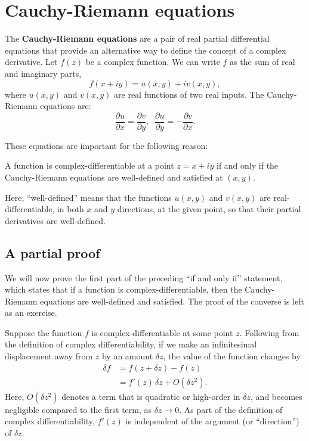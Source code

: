 \documentclass[10pt,a4paper]{article}
\begin{document}
\section{Cauchy-Riemann equations}
\label{cauchy-riemann-equations}

The \textbf{Cauchy-Riemann equations} are a pair of real partial
differential equations that provide an alternative way to define the
concept of a complex derivative. Let $f(z)$ be a complex function. We
can write $f$ as the sum of real and imaginary parts,
\begin{equation}
  f(x + iy) = u(x,y) + i v(x,y),
\end{equation}
where $u(x,y)$ and $v(x,y)$ are real functions of two real inputs.
The Cauchy-Riemann equations are:
\begin{equation}
  \frac{\partial u}{\partial x} = \frac{\partial v}{\partial y},\;\;
  \frac{\partial u}{\partial y} = -\frac{\partial v}{\partial x}.
  \label{cauchyriemann}
\end{equation}

These equations are important for the following reason:

\begin{framed}
\noindent
A function is complex-differentiable at a point $z = x + i y$ if and
only if the Cauchy-Riemann equations are well-defined and satisfied at
$(x,y)$.
\end{framed}

\noindent
Here, ``well-defined'' means that the functions $u(x,y)$ and $v(x,y)$
are real-differentiable, in both $x$ and $y$ directions, at the given
point, so that their partial derivatives are well-defined.

\subsection{A partial proof}\label{proof}

We will now prove the first part of the preceding ``if and only if''
statement, which states that if a function is complex-differentiable,
then the Cauchy-Riemann equations are well-defined and satisfied. The
proof of the converse is left as an exercise.

Suppose the function $f$ is complex-differentiable at some point
$z$. Following from the definition of complex differentiability, if we
make an infinitesimal displacement away from $z$ by an amount $\delta
z$, the value of the function changes by
\begin{align}
  \delta f &= f(z + \delta z) - f(z) \\
  &= f'(z)\, \delta z + O(\delta z^2). \label{fprev}
\end{align}
Here, $O(\delta z^2)$ denotes a term that is quadratic or high-order
in $\delta z$, and becomes negligible compared to the first term, as
$\delta z \rightarrow 0$. As part of the definition of complex
differentiability, $f'(z)$ is independent of the argument (or
``direction'') of $\delta z$.
\end{document}
